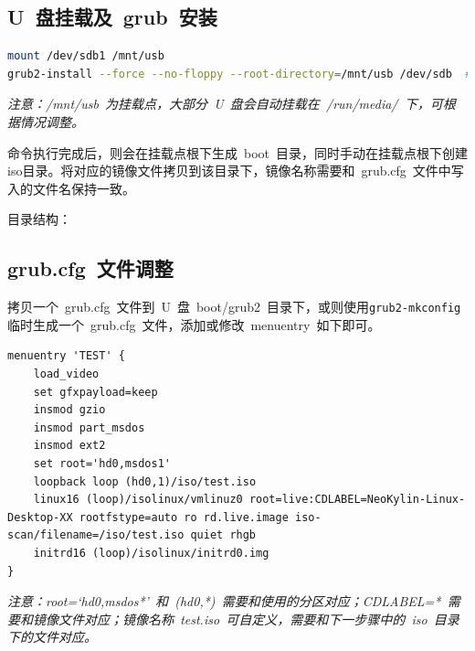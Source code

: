 \documentclass[a4paper]{ctexart}
\begin{document}
\subsection{U~盘挂载及~grub~安装}

\begin{lstlisting}[language=bash]
mount /dev/sdb1 /mnt/usb
grub2-install --force --no-floppy --root-directory=/mnt/usb /dev/sdb  #有些系统可能为 grub-install
\end{lstlisting}

\emph{注意：/mnt/usb~为挂载点，大部分~U~盘会自动挂载在~/run/media/~下，可根据情况调整。}

命令执行完成后，则会在挂载点根下生成~boot~目录，同时手动在挂载点根下创建iso目录。将对应的镜像文件拷贝到该目录下，镜像名称需要和~grub.cfg~文件中写入的文件名保持一致。

目录结构：

\begin{figure}[htbp]
\setlength{\leftskip}{3em}
\end{figure}


\subsection{grub.cfg~文件调整}
拷贝一个~grub.cfg~文件到~U~盘~boot/grub2~目录下，或则使用\verb|grub2-mkconfig|临时生成一个~grub.cfg~文件，添加或修改~menuentry~如下即可。

\begin{lstlisting}
menuentry 'TEST' {
    load_video
    set gfxpayload=keep
    insmod gzio
    insmod part_msdos
    insmod ext2
    set root='hd0,msdos1'
    loopback loop (hd0,1)/iso/test.iso
    linux16 (loop)/isolinux/vmlinuz0 root=live:CDLABEL=NeoKylin-Linux-Desktop-XX rootfstype=auto ro rd.live.image iso-scan/filename=/iso/test.iso quiet rhgb
    initrd16 (loop)/isolinux/initrd0.img
}
\end{lstlisting}

\emph{注意：root=‘hd0,msdos*’~和~(hd0,*)~需要和使用的分区对应；CDLABEL=*~需要和镜像文件对应；镜像名称~test.iso~可自定义，需要和下一步骤中的~iso~目录下的文件对应。}
\end{document}
